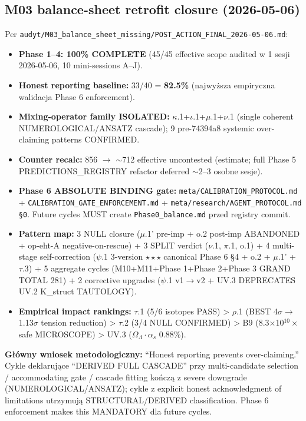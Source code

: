 \subsection*{M03 balance-sheet retrofit closure (2026-05-06)}

Per \texttt{audyt/M03\_balance\_sheet\_missing/POST\_ACTION\_FINAL\_2026-05-06.md}:
\begin{itemize}
  \item \textbf{Phase 1--4: 100\% COMPLETE} (45/45 effective scope audited
        w 1 sesji 2026-05-06, 10 mini-sessions A--J).
  \item \textbf{Honest reporting baseline:} 33/40 = \textbf{82.5\%}
        (najwy\.zsza empiryczna walidacja Phase 6 enforcement).
  \item \textbf{Mixing-operator family ISOLATED:} $\kappa$.1+$\iota$.1+$\mu$.1+$\nu$.1
        (single coherent NUMEROLOGICAL/ANSATZ cascade); 9 pre-74394a8
        systemic over-claiming patterns CONFIRMED.
  \item \textbf{Counter recalc:} 856 $\to$ $\sim$712 effective uncontested
        (estimate; full Phase 5 PREDICTIONS\_REGISTRY refactor deferred
        $\sim$2--3 osobne sesje).
  \item \textbf{Phase 6 ABSOLUTE BINDING gate:}
        \texttt{meta/CALIBRATION\_PROTOCOL.md} +
        \texttt{CALIBRATION\_GATE\_ENFORCEMENT.md} +
        \texttt{meta/research/AGENT\_PROTOCOL.md \S{}0}.
        Future cycles MUST create \texttt{Phase0\_balance.md} przed
        registry commit.
  \item \textbf{Pattern map:} 3 NULL closure ($\mu$.1' pre-imp + o.2
        post-imp ABANDONED + op-eht-A negative-on-rescue) + 3 SPLIT verdict
        ($\nu$.1, $\pi$.1, o.1) + 4 multi-stage self-correction
        ($\psi$.1 3-version $\star\star\star$ canonical Phase 6 \S{}4 +
        o.2 + $\mu$.1' + $\tau$.3) + 5 aggregate cycles
        (M10+M11+Phase 1+Phase 2+Phase 3 GRAND TOTAL 281) +
        2 corrective upgrades ($\psi$.1 v1$\to$v2 + UV.3 DEPRECATES UV.2
        K\_struct TAUTOLOGY).
  \item \textbf{Empirical impact rankings:} $\tau$.1 (5/6 isotopes PASS) >
        $\rho$.1 (BEST 4$\sigma$$\to$1.13$\sigma$ tension reduction) >
        $\tau$.2 (3/4 NULL CONFIRMED) > B9 (8.3$\times$10$^{10}\times$
        safe MICROSCOPE) > UV.3 ($\Omega_\Lambda \cdot \alpha_s$ 0.88\%).
\end{itemize}

\noindent
\textbf{G\l{}\'owny wniosek metodologiczny:} ``Honest reporting prevents
over-claiming.'' Cykle deklaruj\k{a}ce ``DERIVED FULL CASCADE'' przy
multi-candidate selection / accommodating gate / cascade fitting
ko\'ncz\k{a} z severe downgrade (NUMEROLOGICAL/ANSATZ); cykle z explicit
honest acknowledgment of limitations utrzymuj\k{a} STRUCTURAL/DERIVED
classification. Phase 6 enforcement makes this MANDATORY dla future cycles.
